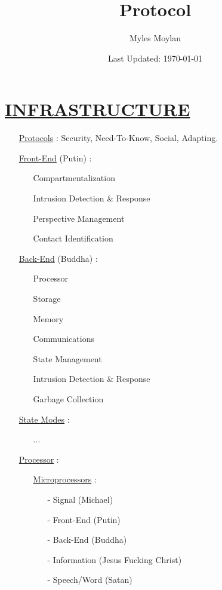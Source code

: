 \documentclass[11pt]{article}
\title{	
	\normalfont \normalsize 
	\huge Protocol
}
\author{Myles Moylan}
\date{Last Updated: \normalsize\today}
\begin{document}
\maketitle
\section*{\ul{INFRASTRUCTURE}}
\begin{enumerate}
	\item[] \ul{Protocols} : Security, Need-To-Know, Social, Adapting.
	
	\item[] \ul{Front-End} (Putin) :
	\begin{enumerate}
		\item[] Compartmentalization
		\item[] Intrusion Detection \& Response
		\item[] Perspective Management
		\item[] Contact Identification
	\end{enumerate}

	\item[] \ul{Back-End} (Buddha) :
	\begin{enumerate}
		\item[] Processor
		\item[] Storage
		\item[] Memory
		\item[] Communications
		\item[] State Management
		\item[] Intrusion Detection \& Response
		\item[] Garbage Collection
	\end{enumerate}

	\item[] \ul{State Modes} :
	\begin{enumerate}
		\item[] ...
	\end{enumerate}

	\item[] \ul{Processor} :
	\begin{enumerate}
		\item[] \ul{Microprocessors} :
		\begin{enumerate}
			\item[-] Signal (Michael)
			\item[-] Front-End (Putin)
			\item[-] Back-End (Buddha)
			\item[-] Information (Jesus Fucking Christ)
			\item[-] Speech/Word (Satan)
		\end{enumerate}
	

\end{enumerate}
\end{enumerate}
\end{document}
